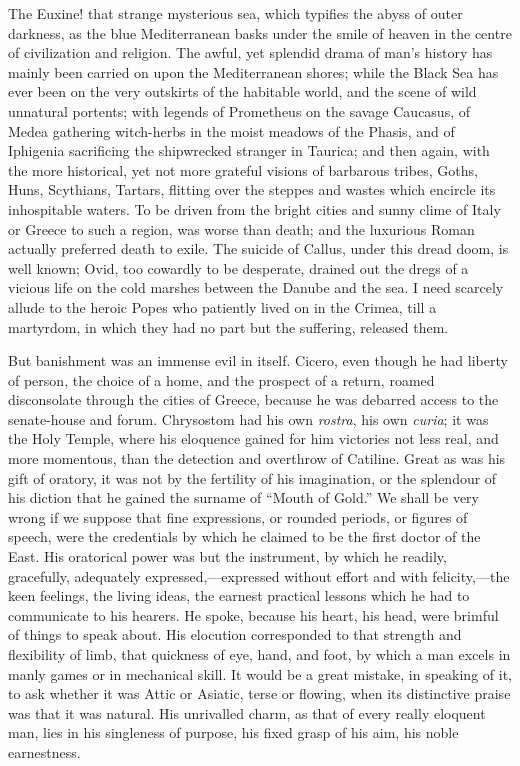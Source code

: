 The Euxine! that strange mysterious sea, which typifies the abyss
of outer darkness, as the blue Mediterranean basks under the smile of
heaven in the centre of civilization and religion. The awful, yet
splendid drama of man's history has mainly been carried on upon the
Mediterranean shores; while the Black Sea has ever been on the very
outskirts of the habitable world, and the scene of wild unnatural
portents; with legends of Prometheus on the savage Caucasus, of Medea
gathering witch-herbs in the moist meadows of the Phasis, and of
Iphigenia sacrificing the shipwrecked stranger in Taurica; and then
again, with the more historical, yet not more grateful visions of
barbarous tribes, Goths, Huns, Scythians, Tartars, flitting over the
steppes and wastes which encircle its inhospitable waters. To be
driven from the bright cities and sunny clime of Italy or Greece to
such a region, was worse than death; and the luxurious Roman actually
preferred death to exile. The suicide of Callus, under this dread
doom, is well known; Ovid, too cowardly to be desperate, drained out
the dregs of a vicious life on the cold marshes between the Danube and
the sea. I need scarcely allude to the heroic Popes who patiently
lived on in the Crimea, till a martyrdom, in which they had no part
but the suffering, released them.

But banishment was an immense evil in itself. Cicero, even though
he had liberty of person, the choice of a home, and the prospect of a
return, roamed disconsolate through the cities of Greece, because he
was debarred access to the senate-house and forum. Chrysostom
had his own \emph{rostra}, his own \emph{curia}; it was the Holy
Temple, where his eloquence gained for him victories not less real,
and more momentous, than the detection and overthrow of Catiline.
Great as was his gift of oratory, it was not by the fertility of his
imagination, or the splendour of his diction that he gained the
surname of ``Mouth of Gold.'' We shall be very wrong if we
suppose that fine expressions, or rounded periods, or figures of
speech, were the credentials by which he claimed to be the first
doctor of the East. His oratorical power was but the instrument, by
which he readily, gracefully, adequately expressed,—expressed
without effort and with felicity,—the keen feelings, the living
ideas, the earnest practical lessons which he had to communicate to
his hearers. He spoke, because his heart, his head, were brimful of
things to speak about. His elocution corresponded to that strength and
flexibility of limb, that quickness of eye, hand, and foot, by which a
man excels in manly games or in mechanical skill. It would be a great
mistake, in speaking of it, to ask whether it was Attic or Asiatic,
terse or flowing, when its distinctive praise was that it was natural.
His unrivalled charm, as that of every really eloquent man, lies in
his singleness of purpose, his fixed grasp of his aim, his noble
earnestness.

